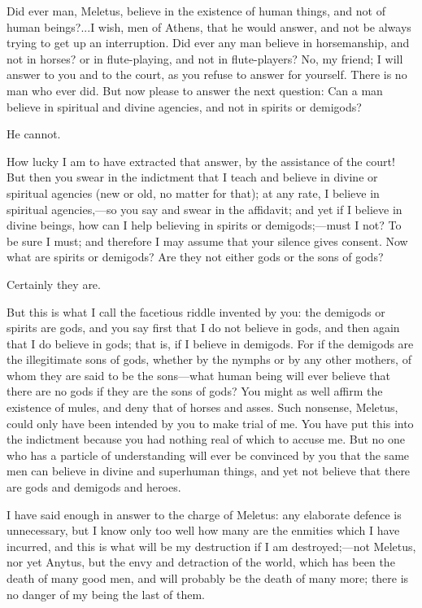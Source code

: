 \documentclass[11pt,letter]{article}
\begin{document}
\par  Did ever man, Meletus, believe in the existence of human things, and not of human beings?...I wish, men of Athens, that he would answer, and not be always trying to get up an interruption. Did ever any man believe in horsemanship, and not in horses? or in flute-playing, and not in flute-players? No, my friend; I will answer to you and to the court, as you refuse to answer for yourself. There is no man who ever did. But now please to answer the next question: Can a man believe in spiritual and divine agencies, and not in spirits or demigods?

\par  He cannot.

\par  How lucky I am to have extracted that answer, by the assistance of the court! But then you swear in the indictment that I teach and believe in divine or spiritual agencies (new or old, no matter for that); at any rate, I believe in spiritual agencies,—so you say and swear in the affidavit; and yet if I believe in divine beings, how can I help believing in spirits or demigods;—must I not? To be sure I must; and therefore I may assume that your silence gives consent. Now what are spirits or demigods? Are they not either gods or the sons of gods?

\par  Certainly they are.

\par  But this is what I call the facetious riddle invented by you: the demigods or spirits are gods, and you say first that I do not believe in gods, and then again that I do believe in gods; that is, if I believe in demigods. For if the demigods are the illegitimate sons of gods, whether by the nymphs or by any other mothers, of whom they are said to be the sons—what human being will ever believe that there are no gods if they are the sons of gods? You might as well affirm the existence of mules, and deny that of horses and asses. Such nonsense, Meletus, could only have been intended by you to make trial of me. You have put this into the indictment because you had nothing real of which to accuse me. But no one who has a particle of understanding will ever be convinced by you that the same men can believe in divine and superhuman things, and yet not believe that there are gods and demigods and heroes.

\par  I have said enough in answer to the charge of Meletus: any elaborate defence is unnecessary, but I know only too well how many are the enmities which I have incurred, and this is what will be my destruction if I am destroyed;—not Meletus, nor yet Anytus, but the envy and detraction of the world, which has been the death of many good men, and will probably be the death of many more; there is no danger of my being the last of them.
\end{document}
